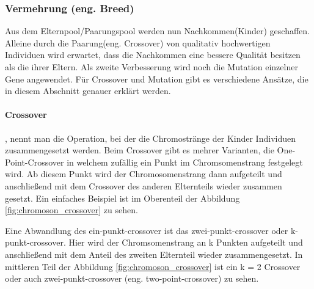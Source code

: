 \begin{itemize}
\end{itemize}


\subsubsection{Vermehrung (eng. Breed)}
Aus dem Elternpool/Paarungspool werden nun Nachkommen(Kinder) geschaffen. Alleine durch die Paarung(eng. Crossover) von qualitativ hochwertigen Individuen wird erwartet, dass die Nachkommen eine bessere Qualität besitzen als die ihrer Eltern. Als zweite Verbesserung wird noch die Mutation einzelner Gene angewendet. Für Crossover und Mutation gibt es verschiedene Ansätze, die in diesem Abschnitt genauer erklärt werden.

\paragraph{Crossover}, nennt man die Operation, bei der die Chromostränge der Kinder Individuen zusammengesetzt werden.
Beim Crossover gibt es mehrer Varianten, die One-Point-Crossover in welchem zufällig ein Punkt im Chromsomenstrang festgelegt wird.
Ab diesem Punkt wird der Chromosomenstrang dann aufgeteilt und anschließend mit dem Crossover des anderen Elternteils wieder zusammen gesetzt. Ein einfaches Beispiel ist im Oberenteil der Abbildung \ref{fig:chromoson_crossover} zu sehen.

Eine Abwandlung des ein-punkt-crossover ist das zwei-punkt-crossover oder k-punkt-crossover. Hier wird der Chromsomenstrang an k Punkten aufgeteilt und anschließend mit dem Anteil des zweiten Elternteil wieder zusammengesetzt.
In mittleren Teil der Abbildung \ref{fig:chromoson_crossover}
ist ein k = 2 Crossover oder auch zwei-punkt-crossover (eng. two-point-crossover) zu sehen.


